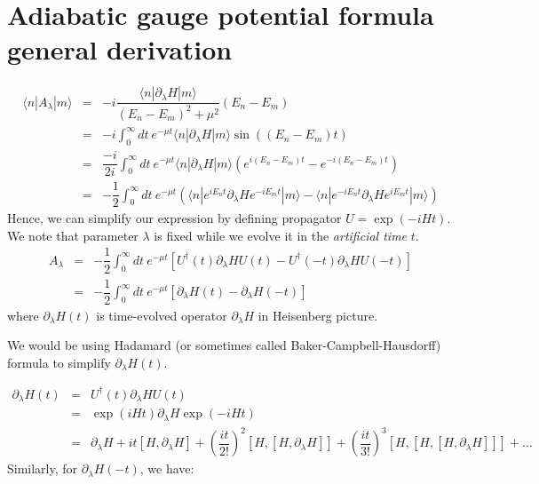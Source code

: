 \documentclass[11pt,a4paper]{article}
\begin{document}
\section{Adiabatic gauge potential formula general derivation}\label{sec.gen_derivation}

\begin{eqnarray}
\langle n | A_{\lambda} | m \rangle &=&   -i \dfrac{\langle n | \partial_{\lambda}H  | m \rangle}{(E_n-E_m)^2 + \mu^2} (E_n-E_m) \\
&=& -i   \int^{\infty}_{0} dt\ e^{-\mu t} \langle n | \partial_{\lambda}H  | m \rangle \sin((E_n-E_m)t) \\
&=& \dfrac{-i }{2i}  \int^{\infty}_{0} dt\ e^{-\mu t} \langle n | \partial_{\lambda}H  | m \rangle \left( e^{i(E_n-E_m)t} - e^{-i(E_n-E_m)t} \right) \\
&=&- \dfrac{ 1}{2}  \int^{\infty}_{0} dt\ e^{-\mu t}  \left(  \langle n | e^{iE_nt} \partial_{\lambda}H   e^{-i E_m t} | m \rangle  -  \langle n |e^{-i E_n t}  \partial_{\lambda}H  e^{ i E_mt} | m \rangle  \right) 
\end{eqnarray}
Hence, we can simplify our expression by defining propagator  $U= \exp(-i H t)$. We note that parameter $\lambda$ is fixed while we evolve it in the \textit{artificial time} $t$.
\begin{eqnarray}
A_{\lambda} &=& -\dfrac{1}{2 }\int_0^{\infty} dt\ e^{-\mu t} [U^{\dagger}(t ) \partial_{\lambda} H U(t ) - U^{\dagger}(-t ) \partial_{\lambda}H U(-t )]  \\
&=& -\dfrac{1}{2 }\int_0^{\infty} dt\ e^{-\mu t} [ \partial_{\lambda} H (t) -  \partial_{\lambda}H (-t )  ]  
\end{eqnarray}
where $\partial_{\lambda}H (t)$ is time-evolved operator $\partial_{\lambda}H$ in Heisenberg picture.

We would be using  Hadamard (or sometimes called Baker-Campbell-Hausdorff) formula to simplify $\partial_{\lambda}H (t)$.

\begin{eqnarray}
\partial_{\lambda}H (t) &=& U^{\dagger}(t ) \partial_{\lambda} H U(t ) \\
&=& \exp(i H t) \partial_{\lambda} H \exp(-i H t)  \\
&=&  \partial_{\lambda} H  + it [H, \partial_{\lambda} H] + \left(\dfrac{i t}{  2! }\right)^2[H,[H, \partial_{\lambda} H]]  + \left(\dfrac{i t}{  3! }\right)^3 [H,[H,[H, \partial_{\lambda} H]]]   + \ldots
\end{eqnarray}
Similarly,  for $\partial_{\lambda}H (-t)$, we have:
\end{document}
